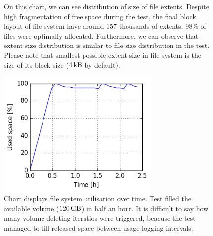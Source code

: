 \documentclass[
  color, %
  table, %
  lof,   %
  lot,   %
]{fithesis3}
\begin{document}
\begin{figure}[h]
    \centering
    \caption[Size distribution of file extents of XFS during testing on SSD with regular trimming]{On this chart, we can see distribution of size of file extents. Despite high fragmentation of free space during the test, the final block layout of file system have around 157 thousands of extents. 98\% of files were optimally allocated. Furthermore, we can observe that extent size distribution is similar to file size distribution in the test. Please note that smallest possible extent size in file system is the size of its block size ($\SI{4}{\kilo\byte}$ by default).}
    \label{fig:used_xfs_ssd_trim}
\end{figure}

\begin{figure}[!h]
    \begin{minipage}{\textwidth}
        \centering
        \includegraphics[width=0.7\textwidth]{../charts/SSD_xfs_trim/usage.png}
        \caption[Usage of available space of XFS during testing on SSD with regular trimming]{Chart displays file system utilisation over time. Test filled the available volume ($\SI{120}{\giga\byte}$) in half an hour. It is difficult to say how many volume deleting iteratios were triggered, beacuse the test managed to fill released space between usage logging intervals.}
\label{fig:usage_xfs_ssd_trim}
    \end{minipage}
\end{figure}
\end{document}
